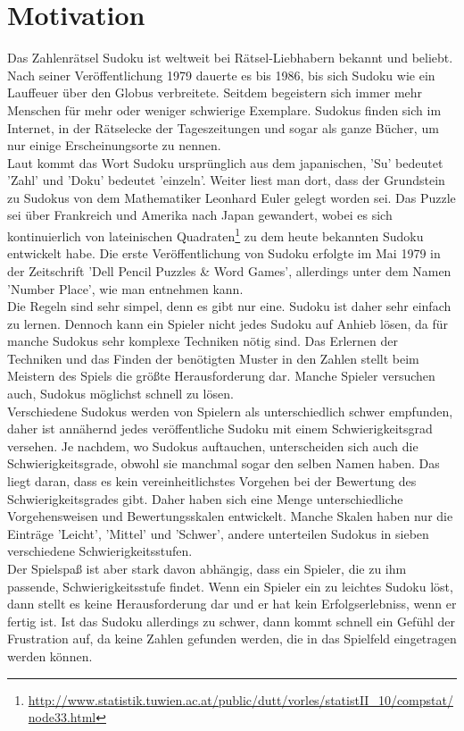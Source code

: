 \section{Motivation}
Das Zahlenrätsel Sudoku ist weltweit bei Rätsel-Liebhabern bekannt und beliebt. Nach seiner Veröffentlichung 1979 dauerte es bis 1986, bis sich Sudoku wie ein Lauffeuer über den Globus verbreitete. Seitdem begeistern sich immer mehr Menschen für mehr oder weniger schwierige Exemplare. Sudokus finden sich im Internet, in der Rätselecke der Tageszeitungen und sogar als ganze Bücher, um nur einige Erscheinungsorte zu nennen. \\
Laut \cite{SuDra:2014:Misc} kommt das Wort Sudoku ursprünglich aus dem japanischen, 'Su' bedeutet 'Zahl' und 'Doku' bedeutet 'einzeln'. Weiter liest man dort, dass der Grundstein zu Sudokus von dem Mathematiker Leonhard Euler gelegt worden sei. Das Puzzle sei über Frankreich und Amerika nach Japan gewandert, wobei es sich kontinuierlich von lateinischen Quadraten\footnote{\url{http://www.statistik.tuwien.ac.at/public/dutt/vorles/statistII_10/compstat/node33.html}} zu dem heute bekannten Sudoku entwickelt habe. Die erste Veröffentlichung von Sudoku erfolgte im Mai 1979 in der Zeitschrift 'Dell Pencil Puzzles \& Word Games', allerdings unter dem Namen 'Number Place', wie man \cite{Wolf2014} entnehmen kann.\\
Die Regeln sind sehr simpel, denn es gibt nur eine. Sudoku ist daher sehr einfach zu lernen. Dennoch kann ein Spieler nicht jedes Sudoku auf Anhieb lösen, da für manche Sudokus sehr komplexe Techniken nötig sind. Das Erlernen der Techniken und das Finden der benötigten Muster in den Zahlen stellt beim Meistern des Spiels die größte Herausforderung dar. Manche Spieler versuchen auch, Sudokus möglichst schnell zu lösen.\\
Verschiedene Sudokus werden von Spielern als unterschiedlich schwer empfunden, daher ist annähernd jedes veröffentliche Sudoku mit einem Schwierigkeitsgrad versehen. Je nachdem, wo Sudokus auftauchen, unterscheiden sich auch die Schwierigkeitsgrade, obwohl sie manchmal sogar den selben Namen haben. Das liegt daran, dass es kein vereinheitlichstes Vorgehen bei der Bewertung des Schwierigkeitsgrades gibt. Daher haben sich eine Menge unterschiedliche Vorgehensweisen und Bewertungsskalen entwickelt. Manche Skalen haben nur die Einträge 'Leicht', 'Mittel' und 'Schwer', andere unterteilen Sudokus in sieben verschiedene Schwierigkeitsstufen.\\
Der Spielspaß ist aber stark davon abhängig, dass ein Spieler, die zu ihm passende, Schwierigkeitsstufe findet. Wenn ein Spieler ein zu leichtes Sudoku löst, dann stellt es keine Herausforderung dar und er hat kein Erfolgserlebniss, wenn er fertig ist. Ist das Sudoku allerdings zu schwer, dann kommt schnell ein Gefühl der Frustration auf, da keine Zahlen gefunden werden, die in das Spielfeld eingetragen werden können.\\
